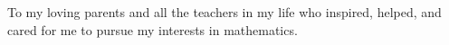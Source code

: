 To my loving parents and all the teachers in my life who inspired, helped, and cared for me to pursue my interests in mathematics.  